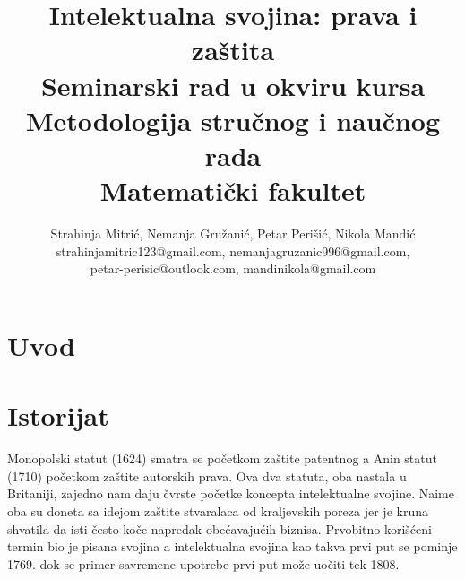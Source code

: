 \documentclass[a4paper]{article}
\begin{document}
\title{Intelektualna svojina: prava i zaštita\\ \small{Seminarski rad u okviru kursa\\Metodologija stručnog i naučnog rada\\ Matematički fakultet}}

\author{Strahinja Mitrić, Nemanja Gružanić, Petar Perišić, Nikola Mandić\\ strahinjamitric123@gmail.com, nemanjagruzanic996@gmail.com,\\ petar-perisic@outlook.com, mandinikola@gmail.com
}

\maketitle



\tableofcontents

\newpage

\section{Uvod}
\label{sec:uvod}


\section{Istorijat}
Monopolski statut (1624) smatra se početkom zaštite patentnog a Anin statut (1710) početkom zaštite autorskih prava. Ova dva statuta, oba nastala u Britaniji, zajedno nam daju čvrste početke koncepta intelektualne svojine. Naime oba su doneta sa idejom zaštite stvaralaca od kraljevskih poreza jer je kruna shvatila da isti često koče napredak obećavajućih biznisa. Prvobitno korišćeni termin bio je pisana svojina a intelektualna svojina kao takva prvi put se pominje 1769. dok se primer savremene upotrebe prvi put može uočiti tek 1808. 
\end{document}
